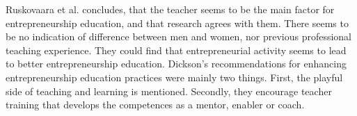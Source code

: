Ruskovaara et al. \citep{ruskovaara} concludes, that the teacher seems to be the main factor for entrepreneurship education, and that research agrees with them. There seems to be no indication of difference between men and women, nor previous professional teaching experience. They could find that entrepreneurial activity seems to lead to better entrepreneurship education. Dickson's recommendations for enhancing entrepreneurship education practices were mainly two things. First, the playful side of teaching and learning is mentioned. Secondly, they encourage teacher training that develops the competences as a mentor, enabler or coach. \citep{dickson}

